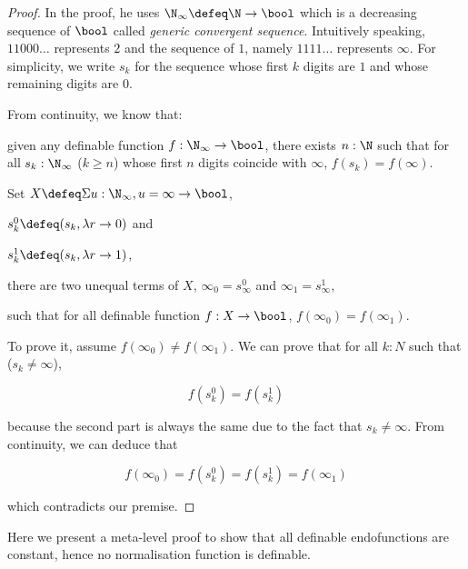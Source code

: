 \begin{proof}
In the proof, he uses $\N_\infty \defeq \N \to \bool$ which is a decreasing sequence of $\bool$ called \emph{generic convergent sequence}. Intuitively speaking, $11000\ldots$ represents $2$ and the sequence of $1$, namely $1111\ldots$ represents $\infty$.
For simplicity, we write $s_k$ for the sequence whose first $k$ digits are $1$ and whose remaining digits are $0$.

From continuity, we know that:

given any definable function $f : \N_\infty \to \bool$, there exists $n : \N$ such that for all $s_k : \N_\infty$ ($k \geq n$) whose first $n$ digits coincide with $\infty$,  $f(s_k) = f(\infty)$.

Set 
$X \defeq \Sigma u : \N_\infty, u = \infty \to \bool$,

$s^0_k \defeq (s_k, \lambda r \to 0)$ and 

$s^1_k \defeq (s_k, \lambda r \to 1)$,

there are two 
unequal terms of $X$, $\infty_0 = s^0_\infty$ and $\infty_1 = s^1_\infty$,

such that for all definable function $f : X \to \bool$, $f(\infty_0) = f(\infty_1)$.

To prove it, assume $f(\infty_0) \not= f(\infty_1)$.
We can prove that for all $k : N$ such that ($s_k \not= \infty$), 

$$f(s^0_k) = f(s^1_k)$$ 

because the second part is always the same due to the fact that $s_k \not= \infty$. From continuity, we can deduce that 

$$f(\infty_0) =f(s^0_k) = f(s^1_k) = f(\infty_1)$$

which contradicts our premise.
\end{proof}


Here we present a meta-level proof to show that all definable endofunctions are constant, hence no normalisation function is definable.





